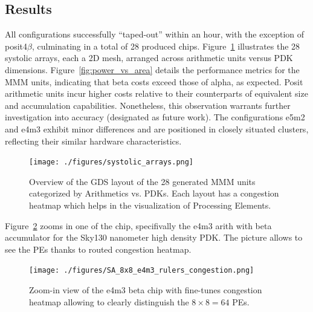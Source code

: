
\subsection{Results}
All configurations successfully ``taped-out'' within an hour, with the exception of posit4$\beta$, culminating in a total of 28 produced chips.
Figure~\ref{fig:all_arrays} illustrates the 28 systolic arrays, each a 2D mesh, arranged across arithmetic units versus PDK dimensions.
Figure~\ref{fig:power_vs_area} details the performance metrics for the MMM units, indicating that beta costs exceed those of alpha, as expected.
Posit arithmetic units incur higher costs relative to their counterparts of equivalent size and accumulation capabilities.
Nonetheless, this observation warrants further investigation into accuracy (designated as future work).
The configurations e5m2 and e4m3 exhibit minor differences and are positioned in closely situated clusters, reflecting their similar hardware characteristics.

\begin{figure}[t]
\centering
	\vspace{-0.5cm}
	\texttt{[image: ./figures/systolic\_arrays.png]}
	\caption{Overview of the GDS layout of the 28 generated MMM units categorized by Arithmetics vs. PDKs. Each layout has a congestion heatmap which helps in the visualization of Processing Elements.}
	\vspace{-0.5cm}
	\label{fig:all_arrays}
\end{figure}

Figure~\ref{fig:focus_on_e4m3} zooms in one of the chip, specifivally the e4m3 arith with beta accumulator for the Sky130 nanometer high density PDK.
The picture allows to see the PEs thanks to routed congestion heatmap.

\begin{figure}[t]
\centering
	\texttt{[image: ./figures/SA\_8x8\_e4m3\_rulers\_congestion.png]}
	\caption{Zoom-in view of the e4m3 beta chip with fine-tunes congestion heatmap allowing to clearly distinguish the $8\times8=64$ PEs.}
	\vspace{-0.5cm}
	\label{fig:focus_on_e4m3}
\end{figure}
